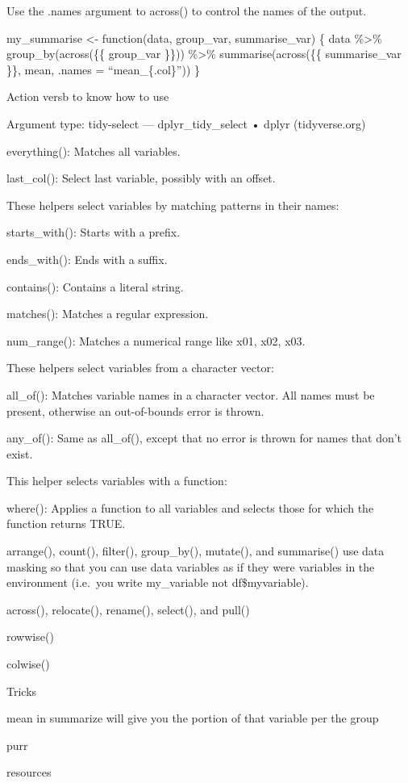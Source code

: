 \documentclass[
  letterpaper,
  DIV=11,
  numbers=noendperiod]{scrreprt}
\begin{document}
Use the .names argument to across() to control the names of the output.

my\_summarise \textless- function(data, group\_var, summarise\_var) \{
data \%\textgreater\% group\_by(across(\{\{ group\_var \}\}))
\%\textgreater\% summarise(across(\{\{ summarise\_var \}\}, mean, .names
= ``mean\_\{.col\}'')) \}

Action versb to know how to use

Argument type: tidy-select --- dplyr\_tidy\_select • dplyr
(tidyverse.org)

everything(): Matches all variables.

last\_col(): Select last variable, possibly with an offset.

These helpers select variables by matching patterns in their names:

starts\_with(): Starts with a prefix.

ends\_with(): Ends with a suffix.

contains(): Contains a literal string.

matches(): Matches a regular expression.

num\_range(): Matches a numerical range like x01, x02, x03.

These helpers select variables from a character vector:

all\_of(): Matches variable names in a character vector. All names must
be present, otherwise an out-of-bounds error is thrown.

any\_of(): Same as all\_of(), except that no error is thrown for names
that don't exist.

This helper selects variables with a function:

where(): Applies a function to all variables and selects those for which
the function returns TRUE.

arrange(), count(), filter(), group\_by(), mutate(), and summarise() use
data masking so that you can use data variables as if they were
variables in the environment (i.e.~you write my\_variable not
df\$myvariable).

across(), relocate(), rename(), select(), and pull()

rowwise()

colwise()

Tricks

mean in summarize will give you the portion of that variable per the
group

purr

resources
\end{document}

